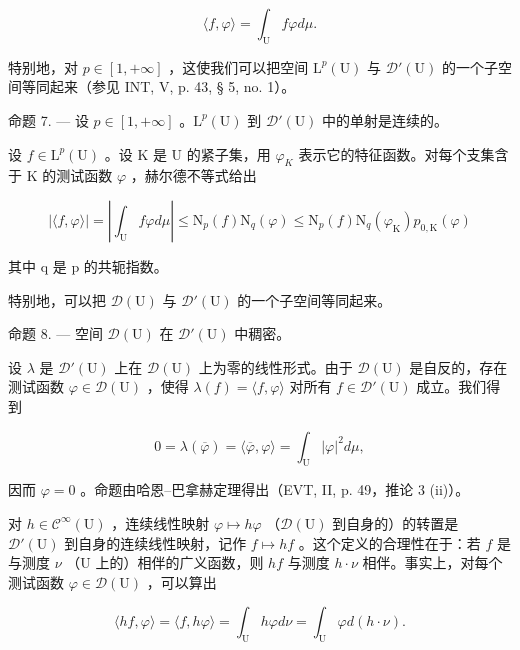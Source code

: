 \[
\langle f, \varphi \rangle = \int_ {\mathrm{U}} f \varphi d \mu .
\]

特别地，对 \(p \in [1, +\infty]\) ，这使我们可以把空间 \(\mathrm{L}^p(\mathrm{U})\) 与 \(\mathcal{D}'(\mathrm{U})\) 的一个子空间等同起来（参见 INT, V, p. 43, § 5, no. 1）。

命题 7. --- 设 \(p \in [1, +\infty]\) 。\(\mathrm{L}^p(\mathrm{U})\) 到 \(\mathcal{D}'(\mathrm{U})\) 中的单射是连续的。

设 \(f \in \mathrm{L}^{p}(\mathrm{U})\) 。设 K 是 U 的紧子集，用 \(\varphi_{K}\) 表示它的特征函数。对每个支集含于 K 的测试函数 \(\varphi\) ，赫尔德不等式给出

\[
| \langle f, \varphi \rangle | = \left| \int_ {\mathrm{U}} f \varphi d \mu \right| \leqslant \mathrm{N} _ {p} (f) \mathrm{N} _ {q} (\varphi) \leqslant \mathrm{N} _ {p} (f) \mathrm{N} _ {q} (\varphi_ {\mathrm{K}}) p _ {0, \mathrm{K}} (\varphi)
\]

其中 q 是 p 的共轭指数。

特别地，可以把 \(\mathcal{D}(\mathrm{U})\) 与 \(\mathcal{D}'(\mathrm{U})\) 的一个子空间等同起来。

命题 8. --- 空间 \(\mathcal{D}(\mathrm{U})\) 在 \(\mathcal{D}'(\mathrm{U})\) 中稠密。

设 \(\lambda\) 是 \(\mathcal{D}'(\mathrm{U})\) 上在 \(\mathcal{D}(\mathrm{U})\) 上为零的线性形式。由于 \(\mathcal{D}(\mathrm{U})\) 是自反的，存在测试函数 \(\varphi \in \mathcal{D}(\mathrm{U})\) ，使得 \(\lambda(f) = \langle f, \varphi \rangle\) 对所有 \(f \in \mathcal{D}'(\mathrm{U})\) 成立。我们得到

\[
0 = \lambda (\overline {{\varphi}}) = \langle \overline {{\varphi}}, \varphi \rangle = \int_ {\mathrm{U}} | \varphi | ^ {2} d \mu ,
\]

因而 \(\varphi = 0\) 。命题由哈恩--巴拿赫定理得出（EVT, II, p. 49，推论 3 (ii)）。

对 \(h \in \mathcal{C}^{\infty}(\mathrm{U})\) ，连续线性映射 \(\varphi \mapsto h\varphi\) （\(\mathcal{D}(\mathrm{U})\) 到自身的）的转置是 \(\mathcal{D}'(\mathrm{U})\) 到自身的连续线性映射，记作 \(f \mapsto hf\) 。这个定义的合理性在于：若 \(f\) 是与测度 \(\nu\) （\(\mathrm{U}\) 上的）相伴的广义函数，则 \(hf\) 与测度 \(h \cdot \nu\) 相伴。事实上，对每个测试函数 \(\varphi \in \mathcal{D}(\mathrm{U})\) ，可以算出

\[
\langle h f, \varphi \rangle = \langle f, h \varphi \rangle = \int_ {\mathrm{U}} h \varphi d \nu = \int_ {\mathrm{U}} \varphi d (h \cdot \nu).
\]

